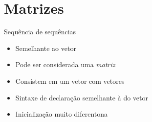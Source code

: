 \documentclass[14pt]{beamer}
\begin{document}
	\section{Matrizes}
		\begin{frame}{Sequência de sequências}
			\begin{itemize}
				\presentationPause\item Semelhante ao vetor
				\presentationPause\item Pode ser considerada uma \emph{matriz}
				\presentationPause\item Consistem em um vetor com vetores
				\presentationPause\item Sintaxe de declaração semelhante à do vetor
				\presentationPause
				\presentationPause\item Inicialização muito diferentona
				\presentationPause
			\end{itemize}
		\end{frame}
\end{document}
